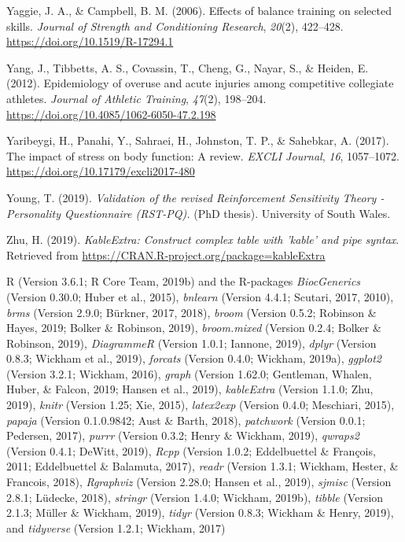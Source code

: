 \documentclass[man,floatsintext]{apa6}
\begin{document}
\leavevmode\hypertarget{ref-Yaggie2006}{}%
Yaggie, J. A., \& Campbell, B. M. (2006). Effects of balance training on selected skills. \emph{Journal of Strength and Conditioning Research}, \emph{20}(2), 422--428. \url{https://doi.org/10.1519/R-17294.1}

\leavevmode\hypertarget{ref-Yang2012}{}%
Yang, J., Tibbetts, A. S., Covassin, T., Cheng, G., Nayar, S., \& Heiden, E. (2012). Epidemiology of overuse and acute injuries among competitive collegiate athletes. \emph{Journal of Athletic Training}, \emph{47}(2), 198--204. \url{https://doi.org/10.4085/1062-6050-47.2.198}

\leavevmode\hypertarget{ref-Yaribeygi2017}{}%
Yaribeygi, H., Panahi, Y., Sahraei, H., Johnston, T. P., \& Sahebkar, A. (2017). The impact of stress on body function: A review. \emph{EXCLI Journal}, \emph{16}, 1057--1072. \url{https://doi.org/10.17179/excli2017-480}

\leavevmode\hypertarget{ref-Young2019}{}%
Young, T. (2019). \emph{Validation of the revised Reinforcement Sensitivity Theory - Personality Questionnaire (RST-PQ).} (PhD thesis). University of South Wales.

\leavevmode\hypertarget{ref-R-kableExtra}{}%
Zhu, H. (2019). \emph{KableExtra: Construct complex table with 'kable' and pipe syntax}. Retrieved from \url{https://CRAN.R-project.org/package=kableExtra}

\thispagestyle{empty}\clearpage

R (Version 3.6.1; R Core Team, 2019b) and the R-packages \emph{BiocGenerics} (Version 0.30.0; Huber et al., 2015), \emph{bnlearn} (Version 4.4.1; Scutari, 2017, 2010), \emph{brms} (Version 2.9.0; Bürkner, 2017, 2018), \emph{broom} (Version 0.5.2; Robinson \& Hayes, 2019; Bolker \& Robinson, 2019), \emph{broom.mixed} (Version 0.2.4; Bolker \& Robinson, 2019), \emph{DiagrammeR} (Version 1.0.1; Iannone, 2019), \emph{dplyr} (Version 0.8.3; Wickham et al., 2019), \emph{forcats} (Version 0.4.0; Wickham, 2019a), \emph{ggplot2} (Version 3.2.1; Wickham, 2016), \emph{graph} (Version 1.62.0; Gentleman, Whalen, Huber, \& Falcon, 2019; Hansen et al., 2019), \emph{kableExtra} (Version 1.1.0; Zhu, 2019), \emph{knitr} (Version 1.25; Xie, 2015), \emph{latex2exp} (Version 0.4.0; Meschiari, 2015), \emph{papaja} (Version 0.1.0.9842; Aust \& Barth, 2018), \emph{patchwork} (Version 0.0.1; Pedersen, 2017), \emph{purrr} (Version 0.3.2; Henry \& Wickham, 2019), \emph{qwraps2} (Version 0.4.1; DeWitt, 2019), \emph{Rcpp} (Version 1.0.2; Eddelbuettel \& François, 2011; Eddelbuettel \& Balamuta, 2017), \emph{readr} (Version 1.3.1; Wickham, Hester, \& Francois, 2018), \emph{Rgraphviz} (Version 2.28.0; Hansen et al., 2019), \emph{sjmisc} (Version 2.8.1; Lüdecke, 2018), \emph{stringr} (Version 1.4.0; Wickham, 2019b), \emph{tibble} (Version 2.1.3; Müller \& Wickham, 2019), \emph{tidyr} (Version 0.8.3; Wickham \& Henry, 2019), and \emph{tidyverse} (Version 1.2.1; Wickham, 2017)
\end{document}
